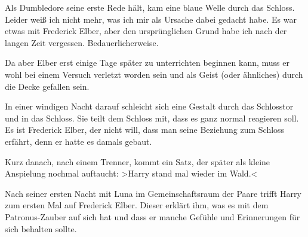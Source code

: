 \begin{kommentar}
Als Dumbledore seine erste Rede hält, kam eine blaue Welle durch das Schloss. Leider weiß ich nicht mehr, was ich mir als Ursache dabei gedacht habe. Es war etwas mit Frederick Elber, aber den ursprünglichen Grund habe ich nach der langen Zeit vergessen. Bedauerlicherweise.
\end{kommentar}

\begin{kommentar}
Da aber Elber erst einige Tage später zu unterrichten beginnen kann, muss er wohl bei einem Versuch verletzt worden sein und als Geist (oder ähnliches) durch die Decke gefallen sein.
\end{kommentar}

\begin{kommentar}
In einer windigen Nacht darauf schleicht sich eine Gestalt durch das Schlosstor und in das Schloss. Sie teilt dem Schloss mit, dass es ganz normal reagieren soll. Es ist Frederick Elber, der nicht will, dass man seine Beziehung zum Schloss erfährt, denn er hatte es damals gebaut.
\end{kommentar}

\begin{kommentar}
Kurz danach, nach einem Trenner, kommt ein Satz, der später als kleine Anspielung nochmal auftaucht: >Harry stand mal wieder im Wald.<
\end{kommentar}

\begin{kommentar}
Nach seiner ersten Nacht mit Luna im Gemeinschaftsraum der Paare trifft Harry zum ersten Mal auf Frederick Elber. Dieser erklärt ihm, was es mit dem Patronus-Zauber auf sich hat und dass er manche Gefühle und Erinnerungen für sich behalten sollte.
\end{kommentar}
